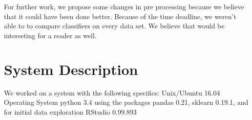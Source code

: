 \documentclass[11pt,a4paper,titlepage]{article}
\begin{document}
For further work, we propose some changes in pre processing because we believe that it could have been done better. Because of the time deadline, we weren't able to to compare classifiers on every data set. We believe that would be interesting for a reader as well.

\section{System Description}
We worked on a system with the following specifics: 
Unix/Ubuntu 16.04 Operating System
python 3.4
using the packages pandas 0.21, sklearn 0.19.1, and for initial data exploration RStudio 0.99.893
\end{document}
